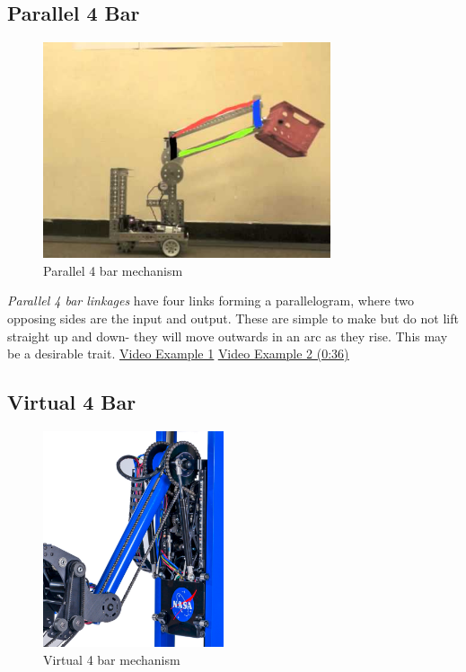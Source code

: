 \subsection{Parallel 4 Bar}
\begin{figure}[H]
	\includegraphics[height=2.5in]{imgs/parallel_4bar.jpeg}
	\caption{Parallel 4 bar mechanism}
\end{figure}

\textit{Parallel 4 bar linkages} have four links forming a parallelogram, where two opposing sides are the input and output. These are simple to make but do not lift straight up and down- they will move outwards in an arc as they rise. This may be a desirable trait. \href{https://www.youtube.com/watch?v=hnxqZlG-508}{\color{red}\underline{Video Example 1}} \href{https://youtu.be/LaV0zbKz-Qg?t=36}{\color{red}\underline{Video Example 2 (0:36)}}
\subsection{Virtual 4 Bar}

\begin{figure}[H]
	\includegraphics[height=2.5in]{imgs/virtual_4bar_1.png}
	\caption{Virtual 4 bar mechanism}
\end{figure}

